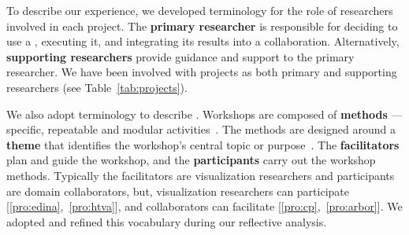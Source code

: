 To describe our experience, we developed terminology for the role of researchers involved in each project. The {\bf primary researcher} is responsible for deciding to use a \workshop, executing it, and integrating its results into a collaboration. Alternatively, {\bf supporting researchers} provide guidance and support to the primary researcher. We have been involved with projects as both primary and supporting researchers (see Table~\ref{tab:projects}).  

We also adopt terminology to describe \workshops. Workshops are composed of {\bf methods} --- specific, repeatable and modular activities~\cite{Crotty1998}. The methods are designed around a {\bf theme} that identifies the workshop's central topic or purpose~\cite{Brooks-Harris1999}. The {\bf facilitators} plan and guide the workshop, and the {\bf participants} carry out the workshop methods. Typically the facilitators are visualization researchers and participants are domain collaborators, but, visualization researchers can participate [\ref{pro:edina},~\ref{pro:htva}], and collaborators can facilitate [\ref{pro:cp},~\ref{pro:arbor}]. We adopted and refined this vocabulary during our reflective analysis.